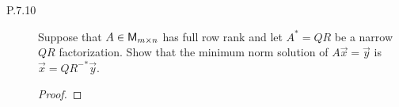 \documentclass{../homework}
\begin{document}
\begin{description}
  \begin{solution}

  \end{solution}

\item[P.7.10] Suppose that \(A \in \mathsf{M}_{m \times n}\) has full row rank
  and let \(A^* = QR\) be a narrow \(QR\) factorization.  Show that
  the minimum norm solution of \(A \vec x = \vec y\) is
  \(\vec x = Q{R^-}^* \vec y\).

  \begin{solution}
    \begin{proof}

    \end{proof}
  \end{solution}
\end{description}
\end{document}
